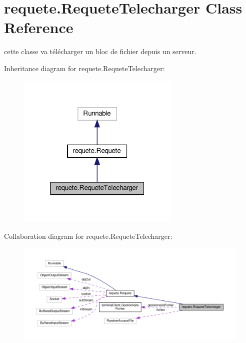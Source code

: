 \hypertarget{classrequete_1_1RequeteTelecharger}{}\section{requete.\+Requete\+Telecharger Class Reference}
\label{classrequete_1_1RequeteTelecharger}


cette classe va télécharger un bloc de fichier depuis un serveur.  




Inheritance diagram for requete.\+Requete\+Telecharger\+:\nopagebreak
\begin{figure}[H]
\begin{center}
\leavevmode
\includegraphics[width=220pt]{classrequete_1_1RequeteTelecharger__inherit__graph}
\end{center}
\end{figure}


Collaboration diagram for requete.\+Requete\+Telecharger\+:\nopagebreak
\begin{figure}[H]
\begin{center}
\leavevmode
\includegraphics[width=350pt]{classrequete_1_1RequeteTelecharger__coll__graph}
\end{center}
\end{figure}
